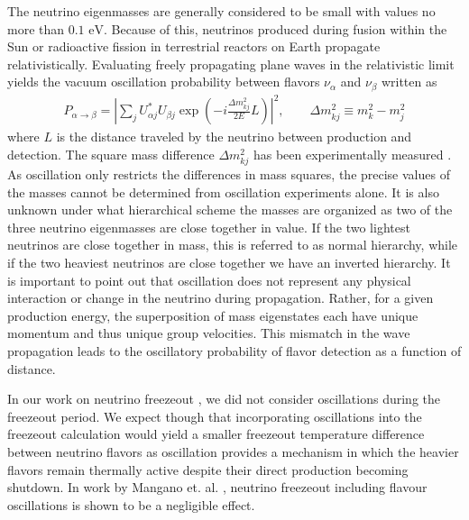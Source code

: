 \documentclass[universe,article,submit,moreauthors,pdftex,a4paper]{Definitions/mdpi}
\newcommand{\eV}{\text{ eV}}
\begin{document}
The neutrino eigenmasses are generally considered to be small with values no more than $0.1\eV$. Because of this, neutrinos produced during fusion within the Sun or radioactive fission in terrestrial reactors on Earth propagate relativistically. Evaluating freely propagating plane waves in the relativistic limit yields the vacuum oscillation probability between flavors $\nu_\alpha$ and $\nu_\beta$ written as
\begin{align}\label{NuOscillation}
    P_{\alpha\rightarrow\beta}
    =\left|\sum_{j}U^{\ast}_{\alpha j}U_{\beta j}\exp{\left(-i\frac{\Delta m^2_{kj}}{2E}L\right)}\right|^{2},\qquad\Delta m^2_{kj}\equiv{m^2_k-m^2_j}
\end{align}
where $L$ is the distance traveled by the neutrino between production and detection. The square mass difference $\Delta m^2_{kj}$ has been experimentally measured \cite{ParticleDataGroup:2022pth}. As oscillation only restricts the differences in mass squares, the precise values of the masses cannot be determined from oscillation experiments alone. It is also unknown under what hierarchical scheme the masses are organized as two of the three neutrino eigenmasses are close together in value. If the two lightest neutrinos are close together in mass, this is referred to as normal hierarchy, while if the two heaviest neutrinos are close together we have an inverted hierarchy. It is important to point out that oscillation does not represent any physical interaction or change in the neutrino during propagation. Rather, for a given production energy, the superposition of mass eigenstates each have unique momentum and thus unique group velocities. This mismatch in the wave propagation leads to the oscillatory probability of flavor detection as a function of distance.

In our work on neutrino freezeout \cite{Birrell:2012gg}, we did not consider oscillations during the freezeout period. We expect though that incorporating oscillations into the freezeout calculation would yield a smaller freezeout temperature difference between neutrino flavors as oscillation provides a mechanism in which the heavier flavors remain thermally active despite their direct production becoming shutdown. In work by Mangano et. al. \cite{Mangano:2005cc}, neutrino freezeout including flavour oscillations is shown to be a negligible effect.

\end{document}
